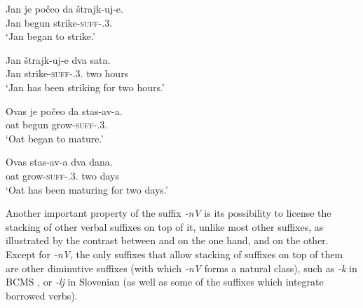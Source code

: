 \documentclass[output=paper,colorlinks,citecolor=brown]{langscibook}
\begin{document}


\ea\label{str:ex:strajk-ova}
	\ea \gll Jan je počeo da štrajk-uj-e.\\ 
Jan {\AUX} begun {\COMP} strike-\textsc{suff}-{\PRS.3.\SG}\\ 
\glt `Jan began to strike.' \label{str:ex:strajk-ova-imperfectivity}

\ex \gll Jan štrajk-uj-e dva sata.\\ 
Jan strike-\textsc{suff}-{\PRS.3.\SG} two hours\\
\glt `Jan has been striking for two hours.' \label{str:ex:strajk-ova-atelicity}

\z

\ex\label{str:ex:stas-ava}
	\ea \gll Ovas je počeo da stas-av-a.\\ 
oat {\AUX} begun {\COMP} grow-\textsc{suff}-{\PRS.3.\SG}\\ 
\glt `Oat began to mature.’ \label{str:ex:stas-ava-imperfectivity}

\ex \gll Ovas stas-av-a dva dana.\\ 
oat grow-\textsc{suff}-{\PRS.3.\SG} two days\\
\glt `Oat has been maturing for two days.' \label{str:ex:stas-ava-atelicity}

\z

\ex\label{str:ex:vik-ne}


\z
\z

\noindent Another important property of the suffix \textit{-nV} is its possibility to license the stacking of other verbal suffixes on top of it, unlike most other suffixes, as illustrated by the contrast between  and  on the one hand, and  on the other. Except for \textit{-nV}, the only suffixes that allow stacking of suffixes on top of them are other diminutive suffixes (with which \textit{-nV} forms a natural class), such as \textit{-k} in BCMS , or \textit{-lj} in Slovenian  (as well as some of the suffixes 
which integrate borrowed verbs).
\end{document}
